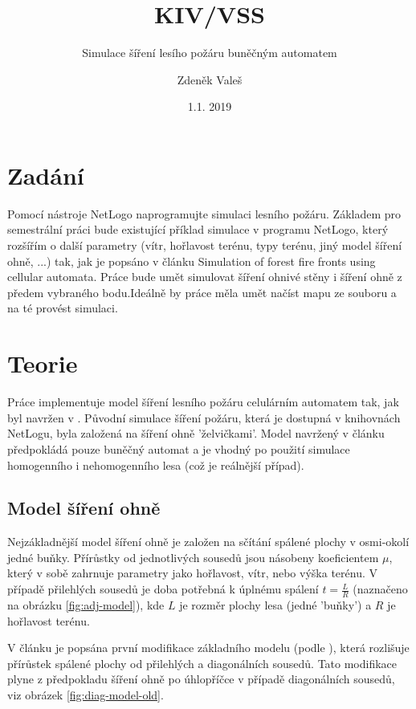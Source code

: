 \documentclass[11pt,a4paper]{scrartcl}
\begin{document}
	\title{KIV/VSS}
	\subtitle{Simulace šíření lesího požáru buněčným automatem}
	\author{Zdeněk Valeš}
	\date{1.1. 2019}
	\maketitle
	\newpage
	
	\section{Zadání}
	Pomocí nástroje NetLogo naprogramujte simulaci lesního požáru. Základem pro semestrální práci bude existující příklad simulace v programu NetLogo, který rozšířím o další parametry (vítr, hořlavost terénu, typy terénu, jiný model šíření ohně, ...) tak, jak je popsáno v článku Simulation of forest fire fronts using cellular automata\cite{source_article}. Práce bude umět simulovat šíření ohnivé stěny i šíření ohně z předem vybraného bodu.Ideálně by práce měla umět načíst mapu ze souboru a na té provést simulaci.
	
	\section{Teorie}
	Práce implementuje model šíření lesního požáru celulárním automatem tak, jak byl navržen v \cite{source_article}. Původní simulace šíření požáru, která je dostupná v knihovnách NetLogu, byla založená na šíření ohně 'želvičkami'. Model navržený v článku předpokládá pouze buněčný automat a je vhodný po použití simulace homogenního i nehomogenního lesa (což je reálnější případ).
	
	\subsection{Model šíření ohně}
	Nejzákladnější model šíření ohně je založen na sčítání spálené plochy v osmi-okolí jedné buňky. Přírůstky od jednotlivých sousedů jsou násobeny koeficientem $\mu$, který v sobě zahrnuje parametry jako hořlavost, vítr, nebo výška terénu. V případě přilehlých sousedů je doba potřebná k úplnému spálení $t=\frac{L}{R}$ (naznačeno na obrázku \ref{fig:adj-model}), kde $L$ je rozměr plochy lesa (jedné 'buňky') a $R$ je hořlavost terénu.
	
	V článku je popsána první modifikace základního modelu (podle \cite{old_model_art}), která rozlišuje přírůstek spálené plochy od přilehlých a diagonálních sousedů. Tato modifikace plyne z předpokladu šíření ohně po úhlopříčce v případě diagonálních sousedů, viz obrázek \ref{fig:diag-model-old}.
	
\end{document}
